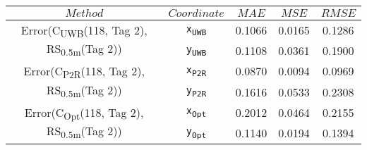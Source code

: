 \begin{table}[h]
\centering
\begin{tabular}{|c|c|c|c|c|}
\hline
$Method$ & $Coordinate$ & $MAE$ & $MSE$ & $RMSE$ \\
\hline
\multirow{2}{*}{{\footnotesize Error(C\textsubscript{UWB}(118, Tag 2), RS\textsubscript{0.5m}(Tag 2))}} & \texttt{x\textsubscript{UWB}} & 0.1066 & 0.0165 & 0.1286 \\
& \texttt{y\textsubscript{UWB}} & 0.1108 & 0.0361 & 0.1900 \\
\hline
\multirow{2}{*}{{\footnotesize Error(C\textsubscript{P2R}(118, Tag 2), RS\textsubscript{0.5m}(Tag 2))}} & \texttt{x\textsubscript{P2R}} & 0.0870 & 0.0094 & 0.0969 \\
& \texttt{y\textsubscript{P2R}} & 0.1616 & 0.0533 & 0.2308 \\
\hline
\multirow{2}{*}{{\footnotesize Error(C\textsubscript{Opt}(118, Tag 2), RS\textsubscript{0.5m}(Tag 2))}} & \texttt{x\textsubscript{Opt}} & 0.2012 & 0.0464 & 0.2155 \\
& \texttt{y\textsubscript{Opt}} & 0.1140 & 0.0194 & 0.1394 \\
\hline
\end{tabular}
\end{table}
